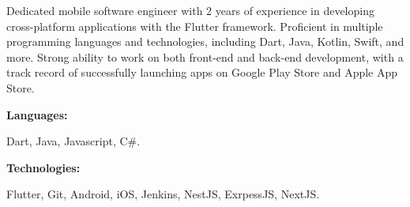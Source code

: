 \documentclass[9pt]{developercv} %
\begin{document}
\begin{minipage}[t]{0.46\textwidth}
	\vspace{-6pt}

	Dedicated mobile software engineer with 2 years of experience in developing cross-platform applications with the Flutter framework. Proficient in multiple programming languages and technologies, including Dart, Java, Kotlin, Swift, and more. Strong ability to work on both front-end and back-end development, with a track record of successfully launching apps on Google Play Store and Apple App Store.

\end{minipage}
\hfill %
\begin{minipage}[t]{0.465\textwidth}
	\vspace{-6pt}

	\begin{minipage}[t]{0.2\textwidth}
		\textbf{Languages:}
	\end{minipage}
	\hfill
	\begin{minipage}[t]{0.73\textwidth}
		Dart, Java, Javascript, C\#.
	\end{minipage}
	\vspace{4mm}

	\begin{minipage}[t]{0.2\textwidth}
		\textbf{Technologies:}
	\end{minipage}
	\hfill
	\begin{minipage}[t]{0.73\textwidth}
		Flutter, Git, Android, iOS, Jenkins, NestJS, ExrpessJS, NextJS.
	\end{minipage}

\end{minipage}
\end{document}
